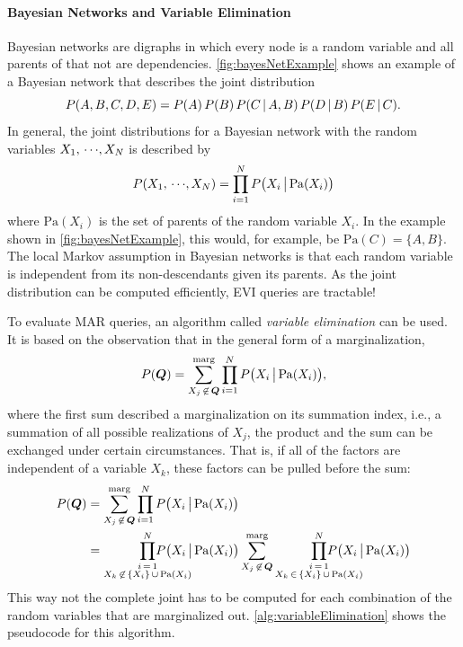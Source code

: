 				\paragraph{Bayesian Networks and Variable Elimination}
					Bayesian networks are digraphs in which every node is a random variable and all parents of that not are dependencies. \autoref{fig:bayesNetExample} shows an example of a Bayesian network that describes the joint distribution
					\begin{equation}
						P(A, B, C, D, E) = P(A) \, P(B) \, P(C \,\vert\, A, B) \, P(D \,\vert\, B) \, P(E \,\vert\, C).
					\end{equation}
					In general, the joint distributions for a Bayesian network with the random variables \( X_1,\,\cdots\!,X_N \) is described by
					\begin{equation}
						P(X_1,\,\cdots\!,X_N) = \prod_{i = 1}^{N} P\big( X_i \,\big\vert\, \mathrm{Pa}(X_i) \big)
					\end{equation}
					where \( \mathrm{Pa}(X_i) \) is the set of parents of the random variable \( X_i \). In the example shown in \autoref{fig:bayesNetExample}, this would, for example, be \( \mathrm{Pa}(C) = \{ A, B \} \). The local Markov assumption in Bayesian networks is that each random variable is independent from its non-descendants given its parents. As the joint distribution can be computed efficiently, EVI queries are tractable!

					To evaluate MAR queries, an algorithm called \emph{variable elimination} can be used. It is based on the observation that in the general form of a marginalization,
					\begin{equation}
						P(\bm{Q}) = \sum_{X_j \,\not\in\, \bm{Q}}^{\text{marg}} \prod_{i = 1}^{N} P\big( X_i \,\big\vert\, \mathrm{Pa}(X_i) \big),
					\end{equation}
					where the first sum described a marginalization on its summation index, i.e., a summation of all possible realizations of \(X_j\), the product and the sum can be exchanged under certain circumstances. That is, if all of the factors are independent of a variable \(X_k\), these factors can be pulled before the sum:
					\begin{align}
						P(\vec{Q})
							&= \sum_{X_j \,\not\in\, \vec{Q}}^{\text{marg}} \prod_{i = 1}^{N} P\big( X_i \biggiven \mathrm{Pa}(X_i) \big) \\
							&= \prod_{\substack{i \,=\, 1 \\ X_k \,\not\in\, \{ X_i \} \,\cup\, \mathrm{Pa}(X_i)}}^{N} \hspace{-1.06cm} P\big( X_i \biggiven \mathrm{Pa}(X_i) \big) \sum_{X_j \,\not\in\, \vec{Q}}^{\text{marg}} \prod_{\substack{i \,=\, 1 \\ X_k \,\in\, \{ X_i \} \,\cup\, \mathrm{Pa}(X_i)}}^{N} \hspace{-1.06cm} P\big( X_i \biggiven \mathrm{Pa}(X_i) \big)
					\end{align}
					This way not the complete joint has to be computed for each combination of the random variables that are marginalized out. \autoref{alg:variableElimination} shows the pseudocode for this algorithm.

